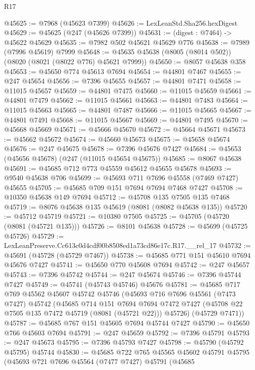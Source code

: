 \begin{lexlean}{R17}
\begin{coremodule}
@45625 := @7968 (@45623 @7399)
@45626 := LexLeanStd.Sha256.hexDigest
@45629 := @45625 (@247 (@45626 @7399))
@45631 := (digest : @7464) -> @45622 @45629
@45635 := @7982 @502 @45621 @45629 @776
@45638 := @7989 (@7996 @45619) @7999
@45648 := @45635 @45638 (@8005 (@8014 @502)) (@8020 (@8021 (@8022 @776) @45621 @7999))
@45650 := @8057 @45638 @358
@45653 := @45650 @774 @45613 @7694
@45654 := @44801 @7467
@45655 := @247 @45654
@45656 := @7396 @45655
@45657 := @44801 @7471
@45658 := @11015 @45657
@45659 := @44801 @7475
@45660 := @11015 @45659
@45661 := @44801 @7479
@45662 := @11015 @45661
@45663 := @44801 @7483
@45664 := @11015 @45663
@45665 := @44801 @7487
@45666 := @11015 @45665
@45667 := @44801 @7491
@45668 := @11015 @45667
@45669 := @44801 @7495
@45670 := @45668 @45669
@45671 := @45666 @45670
@45672 := @45664 @45671
@45673 := @45662 @45672
@45674 := @45660 @45673
@45675 := @45658 @45674
@45676 := @247 @45675
@45678 := @7396 @45676 @7427
@45684 := @45653 (@45656 @45678) (@247 (@11015 @45654 @45675))
@45685 := @8067 @45638
@45691 := @45685 @712 @773 @45559 @45612 @45655 @45678
@45693 := @9540 @45638 @706
@45699 := @45693 @711 @7696 @45558 (@7469 @7427) @45655
@45705 := @45685 @709 @151 @7694 @7694 @7468 @7427
@45708 := @10350 @45638 @149 @7694
@45712 := @45708 @135 @7505 @135 @7468
@45719 := @8076 @45638 @135 @45619 (@8081 (@8082 @45638 @135))
@45720 := @45712 @45719
@45721 := @10380 @7505
@45725 := @45705 (@45720 (@8081 (@45721 @135)))
@45726 := @8101 @45638
@45728 := @45699 (@45725 @45726)
@45729 := LexLeanPreserve.Cc613c0d4cdf00b8508ed1a73cd86e17c.R17.__rel_17
@45732 := @45691 (@45728 (@45729 @7467))
@45738 := @45685 @771 @151 @45610 @7694 @45676 @7427
@45741 := @45650 @770 @45608 @7694
@45742 := @247 @45657
@45743 := @7396 @45742
@45744 := @247 @45674
@45746 := @7396 @45744 @7427
@45749 := @45741 (@45743 @45746) @45676
@45781 := @45685
    @717
    @769
    @45562
    @45607
    @45742
    @45746
    (@45693
      @716
      @7696
      @45561
      (@7473 @7427)
      @45742
      (@45685
        @714
        @151
        @7694
        @7694
        @7472
        @7427
        (@45708 @22 @7505 @135 @7472 @45719 (@8081 (@45721 @22)))
        @45726)
      (@45729 @7471))
@45787 := @45685 @767 @151 @45605 @7694 @45744 @7427
@45790 := @45650 @766 @45603 @7694
@45791 := @247 @45659
@45792 := @7396 @45791
@45793 := @247 @45673
@45795 := @7396 @45793 @7427
@45798 := @45790 (@45792 @45795) @45744
@45830 := @45685
    @722
    @765
    @45565
    @45602
    @45791
    @45795
    (@45693
      @721
      @7696
      @45564
      (@7477 @7427)
      @45791
      (@45685

\end{coremodule}
\end{lexlean}
